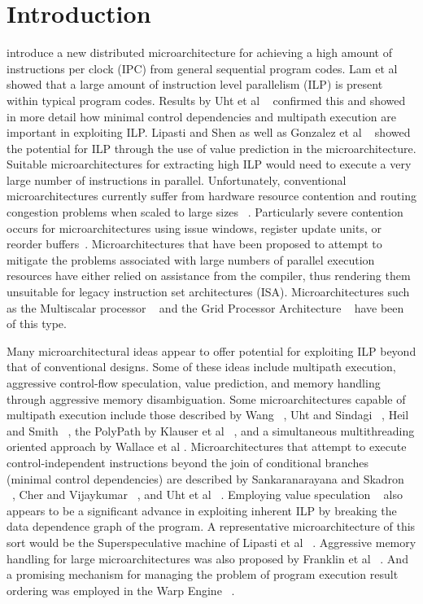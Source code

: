 \documentclass[10pt,twocolumn]{IEEEtran}
\begin{document}
\section{Introduction}
%
 introduce a new distributed microarchitecture for achieving
a high amount of instructions per clock (IPC) from general
sequential program codes.
Lam et al ~\cite{Lam92} showed that a large amount of instruction
level parallelism (ILP) is present within typical program codes.
Results by Uht et al ~\cite{Uht95} confirmed this and showed in more detail
how minimal control dependencies and multipath execution are
important in exploiting ILP.
%
Lipasti and Shen \cite{lipasti96exceeding}
as well as Gonzalez et al ~\cite{Gon97,gonzalez98limits}
showed the potential for ILP through the use of value prediction
in the microarchitecture.
%
Suitable microarchitectures for extracting high ILP would need to
execute a very large number of instructions in parallel.
Unfortunately, conventional microarchitectures currently suffer
from hardware resource contention and routing congestion problems when
scaled to large sizes ~\cite{Palacharla97}.
Particularly severe contention occurs for
microarchitectures using
issue windows,
register update units, or reorder buffers~\cite{Smith95,Bannon95,Kessler98}.
Microarchitectures that have been proposed to attempt to mitigate
the problems associated with large numbers of parallel execution
resources have either relied on assistance from the
compiler, thus rendering them unsuitable for legacy instruction
set architectures (ISA).
Microarchitectures such as the Multiscalar
processor ~\cite{Sohi95} and the Grid Processor Architecture ~\cite{Nag01}
have been of this type.

Many microarchitectural ideas appear to offer potential for
exploiting ILP beyond that of conventional designs.
Some of these ideas include multipath execution,
aggressive control-flow speculation, value prediction, and
memory handling through aggressive memory disambiguation.
Some microarchitectures capable of multipath
execution include those described by Wang ~\cite{Wang90},
Uht and Sindagi ~\cite{Uht95},
Heil and Smith ~\cite{Heil96},
the PolyPath by Klauser et al ~\cite{Klauser98a},
and a simultaneous multithreading oriented approach by
Wallace et al \cite{Wallace98}.
Microarchitectures that attempt to
execute control-independent instructions
beyond the join of conditional branches (minimal control
dependencies) are described by
Sankaranarayana and Skadron ~\cite{Sank01a,Sank01b},
Cher and Vijaykumar ~\cite{Cher01}, and Uht et al ~\cite{Uht01}.
Employing
value speculation ~\cite{lipasti97performance,lipasti98exploiting}
also appears to be a significant advance in exploiting inherent ILP
by breaking the data dependence graph of the program.
A representative microarchitecture of this sort would
be the Superspeculative machine of
Lipasti et al ~\cite{lipasti97superspeculative}.
Aggressive memory handling for large microarchitectures
was also proposed by Franklin et al ~\cite{Franklin96}.
And a promising mechanism for managing the problem of program
execution result ordering was employed in the
Warp Engine ~\cite{Cleary95}.
\end{document}
